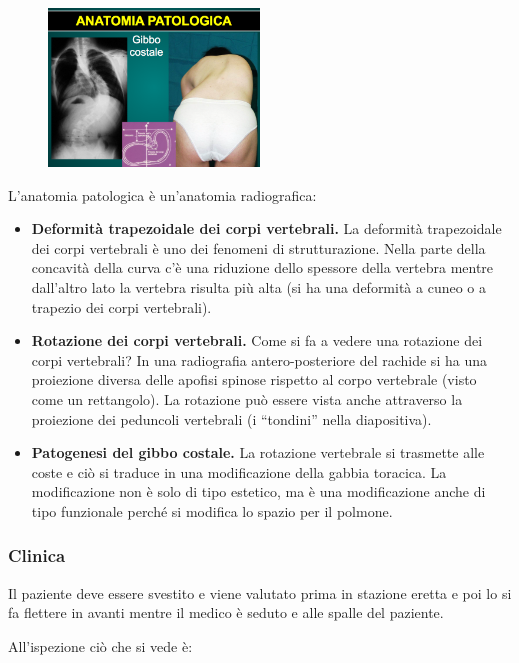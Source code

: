 \begin{figure}[!ht]
\centering
	\includegraphics[width=0.5\textwidth]{012/image20.png}
\end{figure}

L'anatomia patologica è un'anatomia radiografica:

\begin{itemize}
\item
  \textbf{Deformità trapezoidale dei corpi vertebrali.} La deformità
  trapezoidale dei corpi vertebrali è uno dei fenomeni di
  strutturazione. Nella parte della concavità della curva c'è una
  riduzione dello spessore della vertebra mentre dall'altro lato la
  vertebra risulta più alta (si ha una deformità a cuneo o a trapezio
  dei corpi vertebrali).
\item
  \textbf{Rotazione dei corpi vertebrali.} Come si fa a vedere una
  rotazione dei corpi vertebrali? In una radiografia antero-posteriore
  del rachide si ha una proiezione diversa delle apofisi spinose
  rispetto al corpo vertebrale (visto come un rettangolo). La rotazione
  può essere vista anche attraverso la proiezione dei peduncoli
  vertebrali (i ``tondini'' nella diapositiva).
\item
  \textbf{Patogenesi del gibbo costale.} La rotazione vertebrale si
  trasmette alle coste e ciò si traduce in una modificazione della
  gabbia toracica. La modificazione non è solo di tipo estetico, ma è
  una modificazione anche di tipo funzionale perché si modifica lo
  spazio per il polmone.
\end{itemize}

\subsubsection{Clinica}


Il paziente deve essere svestito e viene valutato prima in stazione
eretta e poi lo si fa flettere in avanti mentre il medico è seduto e
alle spalle del paziente.

All'ispezione ciò che si vede è:

